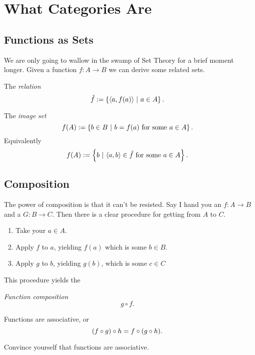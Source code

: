 \chapter{What Categories Are}

\section{Functions as Sets}
    We are only going to wallow in the swamp of Set Theory for a brief moment longer.
    Given a function $f: A \to B$ we can derive some related sets.
    \begin{defi}
        The \emph{relation}
        $$\hat{f} := \left\{ \langle a, f(a) \rangle \ | \  a \in A\right\}.$$ 
    \end{defi}
    \begin{defi}
        The \emph{image set} 
        $$f(A) := \left\{b \in B \ | \   b = f(a) \text{ for some } a \in A\right\}.$$ 
        Equivalently
        $$f(A) := \left\{b \ | \  \langle a, b \rangle \in \hat{f} \text { for some } a \in A\right\}.$$
    \end{defi}

\section{Composition}

    The power of composition is that it can't be resisted.
    Say I hand you an $f : A \to B$ and a $G : B \to C$. 
    Then there is a clear procedure for getting from $A$ to $C$.
    \begin{enumerate}[(1)]
        \item Take your $a \in A$.
        \item Apply $f$ to $a$, yielding $f(a)$ which is some $b \in B$.
        \item Apply $g$ to $b$, yielding $g(b)$, which is some $c \in C$
    \end{enumerate}
    This procedure yields the
    \begin{defi}
        \emph{Function composition}
        $$g\circ f.$$
    \end{defi}

    \begin{fact}
        Functions are associative, or
        $$(f \circ g) \circ h = f \circ (g \circ h).$$
    \end{fact}
    \begin{exercise}
        Convince yourself that functions are associative.
    \end{exercise}

